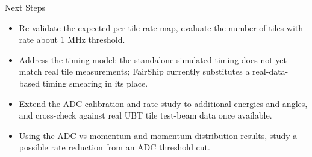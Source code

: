 \documentclass[aspectratio=169,10pt]{beamer}
\begin{document}
\begin{frame}{Next Steps}
  \footnotesize
  \begin{itemize}
    \item \alert{Re-validate the expected per-tile rate map}, evaluate the number of tiles with rate about 1 MHz threshold.
    \item \alert{Address the timing model}: the standalone simulated
      timing does not yet match real tile measurements; FairShip currently
      substitutes a real-data-based timing smearing in its place.
    \item Extend the ADC calibration and rate study to
      additional energies and \alert{angles}, and cross-check against
      real UBT tile test-beam data once available.
    \item Using the ADC-vs-momentum and momentum-distribution results,
      study a possible \alert{rate reduction from an ADC threshold cut}.
  \end{itemize}
\end{frame}
\end{document}
